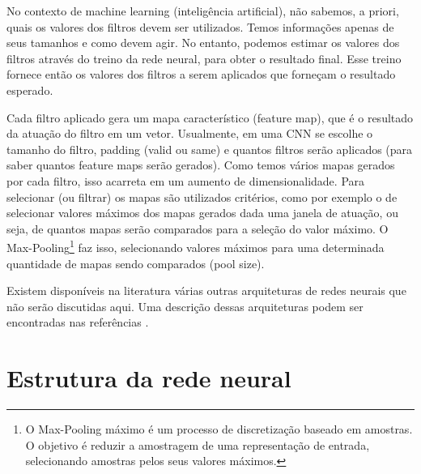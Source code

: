 \documentclass[a4paper,12pt,oneside]{book}
\begin{document}
\par No contexto de machine learning (inteligência artificial), não sabemos, a priori, quais os valores dos filtros devem ser utilizados. Temos informações apenas de seus tamanhos e como devem agir. No entanto, podemos estimar os valores dos filtros através do treino da rede neural, para obter o resultado final. Esse treino fornece então os valores dos filtros a serem aplicados que forneçam o resultado esperado.  

\par Cada filtro aplicado gera um mapa característico (feature map), que é o resultado da atuação do filtro em um vetor. Usualmente, em uma CNN se escolhe o tamanho do filtro, padding (valid ou same) e quantos filtros serão aplicados (para saber quantos feature maps serão gerados). Como temos vários mapas gerados por cada filtro, isso acarreta em um aumento de dimensionalidade. Para selecionar (ou filtrar) os mapas são utilizados critérios, como por exemplo o de selecionar valores máximos dos mapas gerados dada uma janela de atuação, ou seja, de quantos mapas serão comparados para a seleção do valor máximo. O Max-Pooling\footnote{O Max-Pooling máximo é um processo de discretização baseado em amostras. O objetivo é reduzir a amostragem de uma representação de entrada, selecionando amostras pelos seus valores máximos.} faz isso, selecionando valores máximos para uma determinada quantidade de mapas sendo comparados (pool size).


\par Existem disponíveis na literatura várias outras arquiteturas de redes neurais que não serão discutidas aqui. Uma descrição dessas arquiteturas podem ser encontradas nas referências \cite{rbfbook, RNN_fund}.

\section{Estrutura da rede neural}
\end{document}
